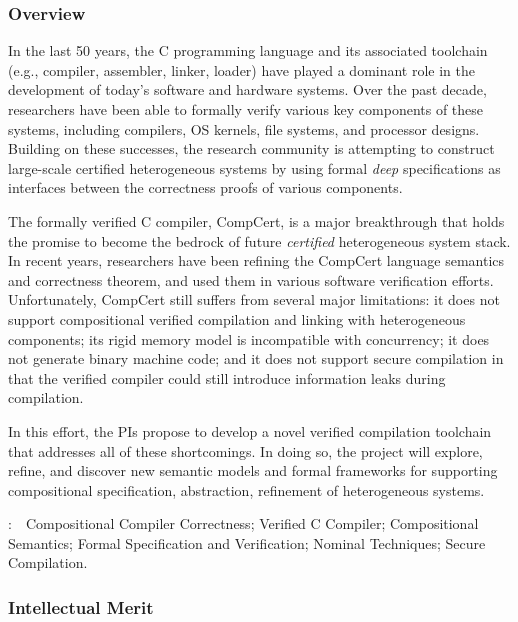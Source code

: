 \subsubsection*{Overview}

In the last 50 years, the C programming language and its associated
toolchain (e.g., compiler, assembler, linker, loader) have played a
dominant role in the development of today's software and hardware
systems.  Over the past decade, researchers have been able to formally
verify various key components of these systems, including compilers,
OS kernels, file systems, and processor designs. Building on these
successes, the research community is attempting to construct
large-scale certified heterogeneous systems by using formal {\em deep}
specifications as interfaces between the correctness proofs of various
components.

The formally verified C compiler, CompCert, is a major breakthrough
that holds the promise to become the bedrock of future {\em certified}
heterogeneous system stack. In recent years, researchers have been
refining the CompCert language semantics and correctness theorem, and
used them in various software verification efforts.  Unfortunately,
CompCert still suffers from several major limitations: it does
not support compositional verified compilation and linking with
heterogeneous components; its rigid memory model is incompatible with
concurrency; it does not generate binary machine code; and it does not
support secure compilation in that the verified compiler could still
introduce information leaks during compilation.

In this effort, the PIs propose to develop a novel verified
compilation toolchain that addresses all of these shortcomings. In
doing so, the project will explore, refine, and discover new semantic
models and formal frameworks for supporting compositional
specification, abstraction, refinement of heterogeneous systems.

\vspace{+2mm}
:~~{Compositional Compiler Correctness; Verified C Compiler; Compositional Semantics; Formal Specification and Verification; Nominal Techniques; Secure Compilation.}

\subsubsection*{Intellectual Merit}

